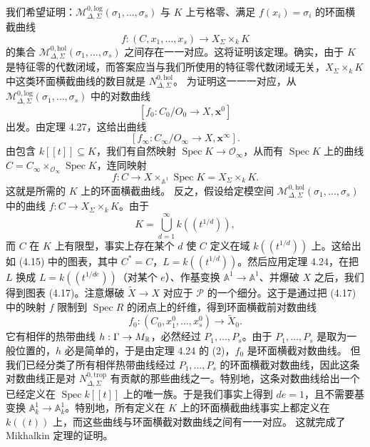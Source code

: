 我们希望证明：$\mathcal M^{0,\mathrm{log}}_{\Delta,\Sigma}(\sigma_1,\dots,\sigma_s)$ 与 $K$ 上亏格零、满足 $f(x_i)=\sigma_i$ 的环面横截曲线
\[
f:(C,x_1,\dots,x_s)\to X_\Sigma\times_k K
\]
的集合 $\mathcal M^{0,\mathrm{hol}}_{\Delta,\Sigma}(\sigma_1,\dots,\sigma_s)$ 之间存在一一对应。这将证明该定理。确实，由于 $K$ 是特征零的代数闭域，而答案应当与我们所使用的特征零代数闭域无关，$X_\Sigma\times_k K$ 中这类环面横截曲线的数目就是 $N^{0,\mathrm{hol}}_{\Delta,\Sigma}$。
为证明这一一一对应，从 $\mathcal M^{0,\mathrm{log}}_{\Delta,\Sigma}(\sigma_1,\dots,\sigma_s)$ 中的对数曲线
\[
[f_0:C_0/O_0\to X,\mathbf{x}^0]
\]
出发。由定理 4.27，这给出曲线
\[
[f_\infty:C_\infty/O_\infty\to X,\mathbf{x}^\infty].
\]
由包含 $k[[t]]\subseteq K$，我们有自然映射 $\operatorname{Spec}K\to\mathcal O_\infty$，从而有 $\operatorname{Spec}K$ 上的曲线 $C=C_\infty\times_{\mathcal O_\infty}\operatorname{Spec}K$，连同映射
\[
f:C\to X\times_{\mathbb{A}^1}\operatorname{Spec}K=X_\Sigma\times_k K .
\]
这就是所需的 $K$ 上的环面横截曲线。
反之，假设给定模空间 $\mathcal M^{0,\mathrm{hol}}_{\Delta,\Sigma}(\sigma_1,\dots,\sigma_s)$ 中的曲线 $f:C\to X_\Sigma\times_k K$。由于
\[
K=\bigcup_{d=1}^{\infty}k((t^{1/d})),
\]
而 $C$ 在 $K$ 上有限型，事实上存在某个 $d$ 使 $C$ 定义在域 $k((t^{1/d}))$ 上。这给出如 (4.15) 中的图表，其中 $C^*=C$，$L=k((t^{1/d}))$。然后应用定理 4.24，在把 $L$ 换成 $L=k((t^{1/de}))$（对某个 $e$）、作基变换 $\mathbb{A}^1\to\mathbb{A}^1$、并爆破 $X$ 之后，我们得到图表 (4.17)。注意爆破 $\widetilde X\to X$ 对应于 $\mathcal P$ 的一个细分。这于是通过把 (4.17) 中的映射 $f$ 限制到 $\operatorname{Spec}R$ 的闭点上的纤维，得到环面横截前对数曲线
\[
f_0:(C_0,x^0_1,\dots,x^0_s)\to\widetilde X_0 .
\]
它有相伴的热带曲线 $h:\Gamma\to M_{\mathbb{R}}$，必然经过 $P_1,\dots,P_s$。由于 $P_1,\dots,P_s$ 是取为一般位置的，$h$ 必是简单的，于是由定理 4.24 的 (2)，$f_0$ 是环面横截对数曲线。
但我们已经分类了所有相伴热带曲线经过 $P_1,\dots,P_s$ 的环面横截对数曲线，因此这条对数曲线正是对 $N^{0,\mathrm{trop}}_{\Delta,\Sigma}$ 有贡献的那些曲线之一。特别地，这条对数曲线给出一个已经定义在 $\operatorname{Spec}k[[t]]$ 上的唯一族。于是我们事实上得到 $de=1$，且不需要基变换 $\mathbb{A}^1_k\to\mathbb{A}^1_k$。特别地，所有定义在 $K$ 上的环面横截曲线事实上都定义在 $k((t))$ 上，而这些曲线与环面横截对数曲线之间有一一对应。
这就完成了 Mikhalkin 定理的证明。

